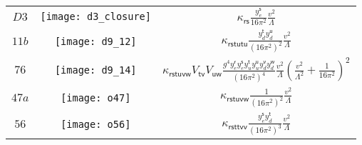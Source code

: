 \begin{longtable}[t]{ccc}
    $D3$ &
      \begin{minipage}{0.2\linewidth}
        \centering
        \texttt{[image: d3\_closure]}
      \end{minipage} & $\displaystyle \kappa_{\textsf{rs}} \frac{y_{e}^{\textsf{s}}}{16\pi^{2}}  \frac{v^{2}}{\Lambda}$ \\
  $11b$ &
          \begin{minipage}{0.3\linewidth}
            \centering
            \texttt{[image: d9\_12]}
          \end{minipage}
        & $\displaystyle \kappa_{\textsf{rstutu}} \frac{y_d^{\textsf{t}} y_d^{\textsf{u}}}{(16\pi^{2})^{2}} \frac{v^{2}}{\Lambda}$ \\
    $76$ &
\begin{minipage}{0.3\linewidth}
  \centering
  \texttt{[image: d9\_14]}
\end{minipage}
  & $\displaystyle \kappa_{\textsf{rstuvw}} V_{\textsf{tv}} V_{\textsf{uw}} \frac{g^{4} y^{\textsf{r}}_{e} y^{\textsf{s}}_{e} y_{u}^{\textsf{t}} y_{u}^{\textsf{u}} y_{d}^{\textsf{v}} y_{d}^{\textsf{w}}}{(16\pi^{2})^{4}} \frac{v^{2}}{\Lambda} \left(\frac{v^{2}}{\Lambda^{2}} + \frac{1}{16\pi^{2}} \right)^{2} $ \\
    $47a$ &
    \begin{minipage}{0.2\linewidth}
        \centering
        \texttt{[image: o47]}
      \end{minipage} & $\displaystyle \kappa_{\textsf{rstuvw}}\frac{1}{(16\pi^{2})^{2}} \frac{v^{2}}{\Lambda}$ \\
  $56$ &
 \begin{minipage}{0.2\linewidth}
  \centering
  \texttt{[image: o56]}
\end{minipage}
  & $\displaystyle \kappa_{\textsf{rsttvv}}\frac{y_{e}^{\textsf{s}} y_{d}^{\textsf{t}}}{(16\pi^{2})^{3}} \frac{v^{2}}{\Lambda}$ \\
  \bottomrule
\end{longtable}

